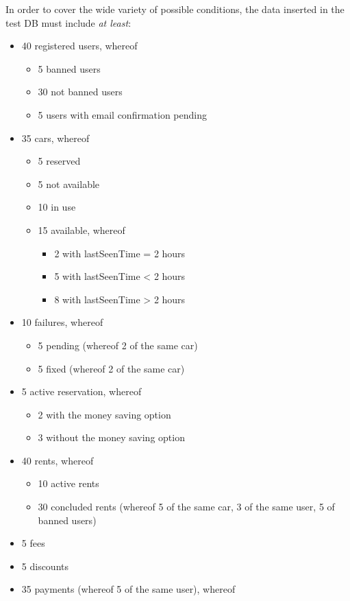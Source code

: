 In order to cover the wide variety of possible conditions, the data inserted in the test DB must include \emph{at least}:
\begin{itemize}
	\item 40 registered users, whereof
	\begin{itemize}
		\item 5 banned users
		\item 30 not banned users
		\item 5 users with email confirmation pending
	\end{itemize}
	\item 35 cars, whereof
	\begin{itemize}
		\item 5 reserved 
		\item 5 not available 
		\item 10 in use 
		\item 15 available, whereof
		\begin{itemize}
			\item 2 with lastSeenTime = 2 hours
			\item 5 with lastSeenTime < 2 hours
			\item 8 with lastSeenTime > 2 hours
		\end{itemize}
	\end{itemize}
	\item 10 failures, whereof
	\begin{itemize}
		\item 5 pending (whereof 2 of the same car)
		\item 5 fixed (whereof 2 of the same car)
	\end{itemize}
	\item 5 active reservation, whereof
	\begin{itemize}
		\item 2 with the money saving option
		\item 3 without the money saving option
	\end{itemize}
	\item 40 rents, whereof
	\begin{itemize}
		\item 10 active rents
		\item 30 concluded rents (whereof 5 of the same car, 3 of the same user, 5 of banned users)
	\end{itemize}
	\item 5 fees
	\item 5 discounts
	\item 35 payments (whereof 5 of the same user), whereof

\end{itemize}
